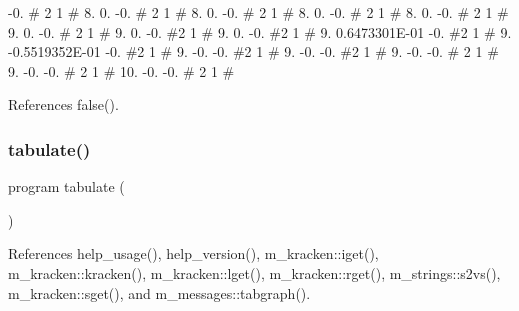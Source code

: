 -\/0. \# 2 1 \# 8. 0. -\/0. \# 2 1 \# 8. 0. -\/0. \# 2 1 \# 8. 0. -\/0. \# 2 1 \# 8. 0. -\/0. \# 2 1 \# 9. 0. -\/0. \# 2 1 \# 9. 0. -\/0. \#2 1 \# 9. 0. -\/0. \#2 1 \# 9. 0.\+6473301E-\/01 -\/0. \#2 1 \# 9. -\/0.\+5519352E-\/01 -\/0. \#2 1 \# 9. -\/0. -\/0. \#2 1 \# 9. -\/0. -\/0. \#2 1 \# 9. -\/0. -\/0. \# 2 1 \# 9. -\/0. -\/0. \# 2 1 \# 10. -\/0. -\/0. \# 2 1 \# 

References false().

\mbox{\label{tabulate_8f90_a013be6cecb71296773686ddf56ac1a34}} 
\subsubsection{\texorpdfstring{tabulate()}{tabulate()}}
{\footnotesize\ttfamily program tabulate (\begin{DoxyParamCaption}{ }\end{DoxyParamCaption})}



References help\+\_\+usage(), help\+\_\+version(), m\+\_\+kracken\+::iget(), m\+\_\+kracken\+::kracken(), m\+\_\+kracken\+::lget(), m\+\_\+kracken\+::rget(), m\+\_\+strings\+::s2vs(), m\+\_\+kracken\+::sget(), and m\+\_\+messages\+::tabgraph().

